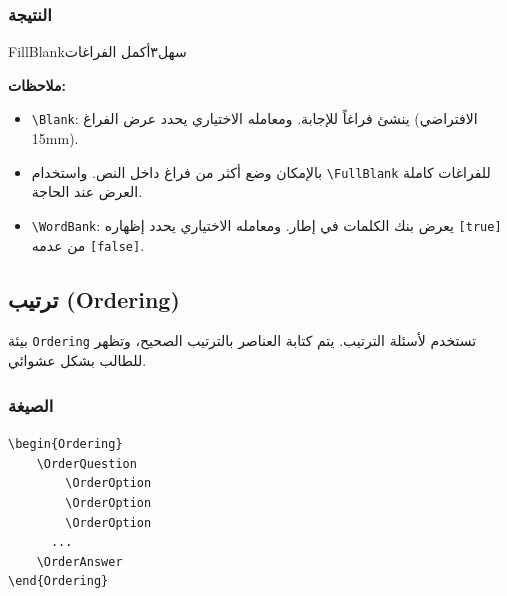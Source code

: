 \documentclass[a4paper]{article}
\newcommand{\engsf}[1]{\textenglish{\textsf{#1}}}
\newcommand{\engtt}[1]{\textenglish{\texttt{#1}}}
\begin{document}
\subsubsection*{النتيجة}

\begin{Question}{FillBlank}{سهل}{٣}{أكمل الفراغات}
\begin{FillBlank}[true]
\end{FillBlank}
\end{Question}

\textbf{ملاحظات:}
\begin{itemize}
    \item \engtt{\textbackslash Blank}: ينشئ فراغاً للإجابة. ومعامله الاختياري يحدد عرض الفراغ (الافتراضي \engsf{15mm}).
    \item بالإمكان وضع أكثر من فراغ داخل النص. واستخدام \engtt{\textbackslash FullBlank} للفراغات كاملة العرض عند الحاجة.
    \item \engtt{\textbackslash WordBank}: يعرض بنك الكلمات في إطار. ومعامله الاختياري يحدد إظهاره \engtt{[true]} من عدمه \engtt{[false]}.

\end{itemize}

\subsection{ترتيب (Ordering)}

بيئة \engtt{Ordering} تستخدم لأسئلة الترتيب. يتم كتابة العناصر بالترتيب الصحيح، وتظهر للطالب بشكل عشوائي.

\subsubsection*{الصيغة}

\begin{LTR}\ttfamily
\verb|\begin{Ordering}|\\
\verb|    \OrderQuestion|\\
\verb|        \OrderOption|\\
\verb|        \OrderOption|\\
\verb|        \OrderOption|\\
\verb|      ...|\\
\verb|    \OrderAnswer|\RL{[العرض]}\\
\verb|\end{Ordering}|
\end{LTR}
\end{document}

